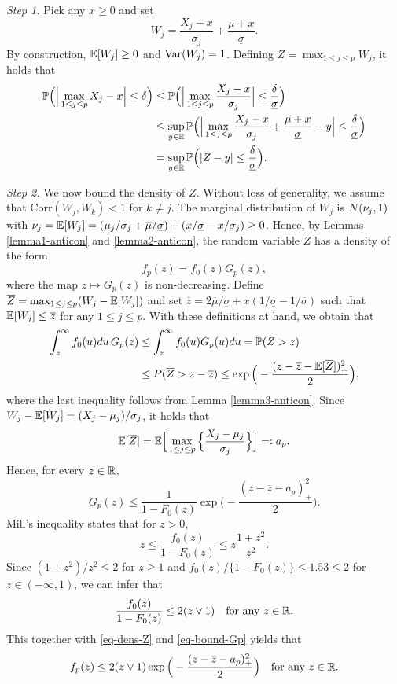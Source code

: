 \documentclass[a4paper,12pt]{article}
\begin{document}
\textit{Step 1.} %
Pick any $x \ge 0$ and set 
\[ W_j = \frac{X_j - x}{\sigma_j} + \frac{\overline{\mu} + x}{\underline{\sigma}}. \]
By construction, $\mathbb{E}[W_j] \ge 0$ and $\textnormal{Var}(W_j) = 1$. Defining $Z = \max_{1 \le j \le p} W_j$, it holds that  
\begin{align*}
\mathbb{P} \Big( \Big| \max_{1 \le j \le p} X_j - x \Big| \le \delta \Big) 
 & \le \mathbb{P} \Big( \Big| \max_{1 \le j \le p} \frac{X_j - x}{\sigma_j} \Big| \le \frac{\delta}{\underline{\sigma}} \Big) \\
 & \le \sup_{y \in \mathbb{R}} \mathbb{P} \Big( \Big| \max_{1 \le j \le p} \frac{X_j - x}{\sigma_j} + \frac{\overline{\mu} + x}{\underline{\sigma}} - y \Big| \le \frac{\delta}{\underline{\sigma}} \Big) \\
 & = \sup_{y \in \mathbb{R}} \mathbb{P} \Big( |Z - y| \le \frac{\delta}{\underline{\sigma}} \Big). 
\end{align*}


\textit{Step 2.} We now bound the density of $Z$. Without loss of generality, we assume that $\text{Corr}(W_j,W_k) < 1$ for $k \ne j$. The marginal distribution of $W_j$ is $N(\nu_j,1)$ with $\nu_j = \mathbb{E}[W_j] = (\mu_j/\sigma_j + \overline{\mu}/{\underline{\sigma}}) + (x/\underline{\sigma} - x/\sigma_j) \ge 0$. Hence, by Lemmas \ref{lemma1-anticon} and \ref{lemma2-anticon}, the random variable $Z$ has a density of the form
\begin{equation}\label{eq-dens-Z}
f_p(z) = f_0(z) G_p(z), 
\end{equation}
where the map $z \mapsto G_p(z)$ is non-decreasing. Define $\overline{Z} = \max_{1 \le j \le p} (W_j - \mathbb{E}[W_j])$ and set $\overline{z} = 2 \overline{\mu}/\underline{\sigma} + x(1/\underline{\sigma} - 1/\overline{\sigma})$ such that $\mathbb{E}[W_j] \le \overline{z}$ for any $1 \le j \le p$. With these definitions at hand, we obtain that  
\begin{align*}
\int_z^{\infty} f_0(u)du \, G_p(z) & \le \int_z^{\infty} f_0(u) G_p(u) du = \mathbb{P}(Z > z) \\ 
 & \le P(\overline{Z} > z - \overline{z}) \le \exp \Big( - \frac{(z - \overline{z} - \mathbb{E}[\overline{Z}])^2_+}{2} \Big), 
\end{align*}
where the last inequality follows from Lemma \ref{lemma3-anticon}. Since $W_j - \mathbb{E}[W_j] = (X_j - \mu_j)/\sigma_j$, it holds that 
\[ \mathbb{E}[\overline{Z}] = \mathbb{E} \Big[ \max_{1 \le j \le p} \Big\{ \frac{X_j-\mu_j}{\sigma_j} \Big\} \Big] =: a_p. \]
Hence, for every $z \in \mathbb{R}$, 
\begin{equation}\label{eq-bound-Gp}
G_p(z) \le \frac{1}{1 - F_0(z)} \exp\Big( - \frac{(z - \overline{z} - a_p)_+^2}{2} \Big). 
\end{equation}
Mill's inequality states that for $z > 0$, 
\[ z \le \frac{f_0(z)}{1-F_0(z)} \le z \frac{1+z^2}{z^2}. \]
Since $(1+z^2)/z^2 \le 2$ for $z \ge 1$ and $f_0(z)/\{1-F_0(z)\} \le 1.53 \le 2$ for $z \in (-\infty,1)$, we can infer that
\[ \frac{f_0(z)}{1-F_0(z)} \le 2 (z \vee 1) \quad \text{for any } z \in \mathbb{R}. \]
This together with \eqref{eq-dens-Z} and \eqref{eq-bound-Gp} yields that
\[ f_p(z) \le 2 (z \vee 1)  \exp\Big( - \frac{(z - \overline{z} - a_p)_+^2}{2} \Big) \quad \text{for any } z \in \mathbb{R}. \]
 
\end{document}
